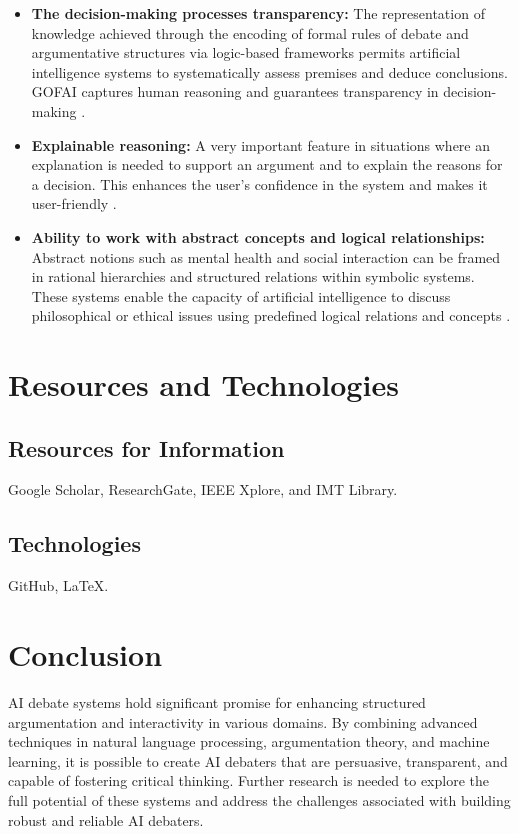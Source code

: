 \documentclass[conference]{IEEEtran}
\begin{document}
\begin{itemize}
    \item \textbf{The decision-making processes transparency:} The representation of knowledge achieved through the encoding of formal rules of debate and argumentative structures via logic-based frameworks permits artificial intelligence systems to systematically assess premises and deduce conclusions. GOFAI captures human reasoning and guarantees transparency in decision-making \cite{b8}.
    \item \textbf{Explainable reasoning:} A very important feature in situations where an explanation is needed to support an argument and to explain the reasons for a decision. This enhances the user's confidence in the system and makes it user-friendly \cite{b9}.
    \item \textbf{Ability to work with abstract concepts and logical relationships:} Abstract notions such as mental health and social interaction can be framed in rational hierarchies and structured relations within symbolic systems. These systems enable the capacity of artificial intelligence to discuss philosophical or ethical issues using predefined logical relations and concepts \cite{b8}.
\end{itemize}

\section{Resources and Technologies}

\subsection{Resources for Information}
Google Scholar, ResearchGate, IEEE Xplore, and IMT Library.

\subsection{Technologies}
GitHub, LaTeX.

\section{Conclusion}
AI debate systems hold significant promise for enhancing structured argumentation and interactivity in various domains. By combining advanced techniques in natural language processing, argumentation theory, and machine learning, it is possible to create AI debaters that are persuasive, transparent, and capable of fostering critical thinking. Further research is needed to explore the full potential of these systems and address the challenges associated with building robust and reliable AI debaters.
\end{document}
